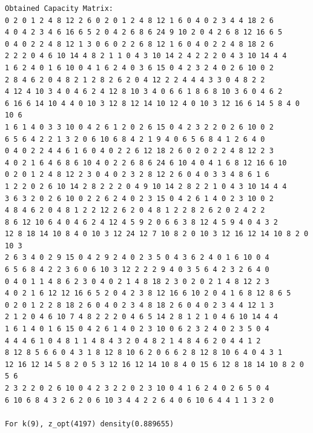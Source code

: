 \documentclass[11pt]{article}
\begin{document}
\begin{lstlisting}
Obtained Capacity Matrix:
0 2 0 1 2 4 8 12 2 6 0 2 0 1 2 4 8 12 1 6 0 4 0 2 3 4 4 18 2 6
4 0 4 2 3 4 6 16 6 5 2 0 4 2 6 8 6 24 9 10 2 0 4 2 6 8 12 16 6 5
0 4 0 2 2 4 8 12 1 3 0 6 0 2 2 6 8 12 1 6 0 4 0 2 2 4 8 18 2 6
2 2 2 0 4 6 10 14 4 8 2 1 1 0 4 3 10 14 2 4 2 2 2 0 4 3 10 14 4 4
1 6 2 4 0 1 6 10 0 4 1 6 2 4 0 3 6 15 0 4 2 3 2 4 0 2 6 10 0 2
2 8 4 6 2 0 4 8 2 1 2 8 2 6 2 0 4 12 2 2 4 4 4 3 3 0 4 8 2 2
4 12 4 10 3 4 0 4 6 2 4 12 8 10 3 4 0 6 6 1 8 6 8 10 3 6 0 4 6 2
6 16 6 14 10 4 4 0 10 3 12 8 12 14 10 12 4 0 10 3 12 16 6 14 5 8 4 0 10 6
1 6 1 4 0 3 3 10 0 4 2 6 1 2 0 2 6 15 0 4 2 3 2 2 0 2 6 10 0 2
6 5 6 4 2 2 1 3 2 0 6 10 6 8 4 2 1 9 4 0 6 5 6 8 4 1 2 6 4 0
0 4 0 2 2 4 4 6 1 6 0 4 0 2 2 6 12 18 2 6 0 2 0 2 2 4 8 12 2 3
4 0 2 1 6 4 6 8 6 10 4 0 2 2 6 8 6 24 6 10 4 0 4 1 6 8 12 16 6 10
0 2 0 1 2 4 8 12 2 3 0 4 0 2 3 2 8 12 2 6 0 4 0 3 3 4 8 6 1 6
1 2 2 0 2 6 10 14 2 8 2 2 2 0 4 9 10 14 2 8 2 2 1 0 4 3 10 14 4 4
3 6 3 2 0 2 6 10 0 2 2 6 2 4 0 2 3 15 0 4 2 6 1 4 0 2 3 10 0 2
4 8 4 6 2 0 4 8 1 2 2 12 2 6 2 0 4 8 1 2 2 8 2 6 2 0 2 4 2 2
8 6 12 10 6 4 0 4 6 2 4 12 4 5 9 2 0 6 6 3 8 12 4 5 9 4 0 4 3 2
12 8 18 14 10 8 4 0 10 3 12 24 12 7 10 8 2 0 10 3 12 16 12 14 10 8 2 0 10 3
2 6 3 4 0 2 9 15 0 4 2 9 2 4 0 2 3 5 0 4 3 6 2 4 0 1 6 10 0 4
6 5 6 8 4 2 2 3 6 0 6 10 3 12 2 2 2 9 4 0 3 5 6 4 2 3 2 6 4 0
0 4 0 1 1 4 8 6 2 3 0 4 0 2 1 4 8 18 2 3 0 2 0 2 1 4 8 12 2 3
4 0 2 1 6 12 12 16 6 5 2 0 4 2 3 8 12 16 6 10 2 0 4 1 6 8 12 8 6 5
0 2 0 1 2 2 8 18 2 6 0 4 0 2 3 4 8 18 2 6 0 4 0 2 3 4 4 12 1 3
2 1 2 0 4 6 10 7 4 8 2 2 2 0 4 6 5 14 2 8 1 2 1 0 4 6 10 14 4 4
1 6 1 4 0 1 6 15 0 4 2 6 1 4 0 2 3 10 0 6 2 3 2 4 0 2 3 5 0 4
4 4 4 6 1 0 4 8 1 1 4 8 4 3 2 0 4 8 2 1 4 8 4 6 2 0 4 4 1 2
8 12 8 5 6 6 0 4 3 1 8 12 8 10 6 2 0 6 6 2 8 12 8 10 6 4 0 4 3 1
12 16 12 14 5 8 2 0 5 3 12 16 12 14 10 8 4 0 15 6 12 8 18 14 10 8 2 0 5 6
2 3 2 2 0 2 6 10 0 4 2 3 2 2 0 2 3 10 0 4 1 6 2 4 0 2 6 5 0 4
6 10 6 8 4 3 2 6 2 0 6 10 3 4 4 2 2 6 4 0 6 10 6 4 4 1 1 3 2 0

For k(9), z_opt(4197) density(0.889655)


\end{lstlisting}
\end{document}

